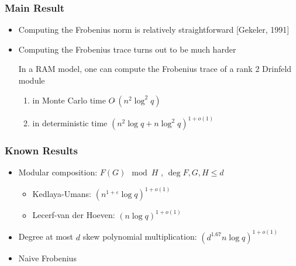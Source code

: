\documentclass{beamer}
\begin{document}


\begin{frame}
\frametitle{Main Result}

\begin{itemize}
\item Computing the Frobenius norm is relatively straightforward [Gekeler, 1991]
\item Computing the Frobenius trace turns out to be much harder

\begin{theorem}
In a RAM model, one can compute the Frobenius trace of a rank 2 Drinfeld module
\begin{enumerate}
\item in Monte Carlo time $O\tilde{~}(n^2 \log^2 q)$
\item in deterministic time $(n^2 \log q + n \log^2 q)^{1+o(1)}$

\end{enumerate}
\end{theorem}

\end{itemize}


\end{frame}


\begin{frame}
\frametitle{Known Results}

\begin{itemize}
\item Modular composition: $F(G) \mod H$ , $\deg F, G,H \leq d$
\begin{itemize}
    \item Kedlaya-Umans: $(n^{1 + \varepsilon}
\log q)^{1+o(1)}$
    \item Lecerf-van der Hoeven: $(n
\log q)^{1+o(1)}$
\end{itemize}
\item Degree at most $d$ skew polynomial multiplication: $(d^{1.67} n\log q)^{1+o(1)}$
\item Naive Frobenius
    
\end{itemize}


\end{frame}


\end{document}
